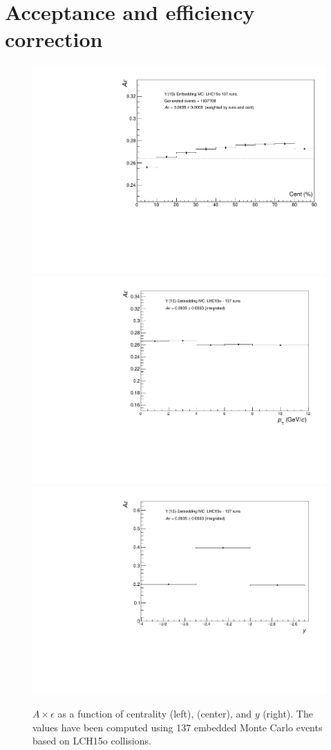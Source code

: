 \section{Acceptance and efficiency correction}

\begin{figure}[htp]

\centering
\includegraphics[width=.3\textwidth]{Chapters/Analysis/Figs/Axe/AccEffvsCent.pdf}\hfill
\includegraphics[width=.3\textwidth]{Chapters/Analysis/Figs/Axe/AccEffvsPt.pdf}\hfill
\includegraphics[width=.3\textwidth]{Chapters/Analysis/Figs/Axe/AccEffvsY.pdf}

\caption{$A\times\epsilon$ as a function of centrality (left), \pt (center), and $y$ (right). The values have been computed using 137 embedded Monte Carlo events based on LCH15o collisions.}
\label{fig:Axe}

\end{figure}

